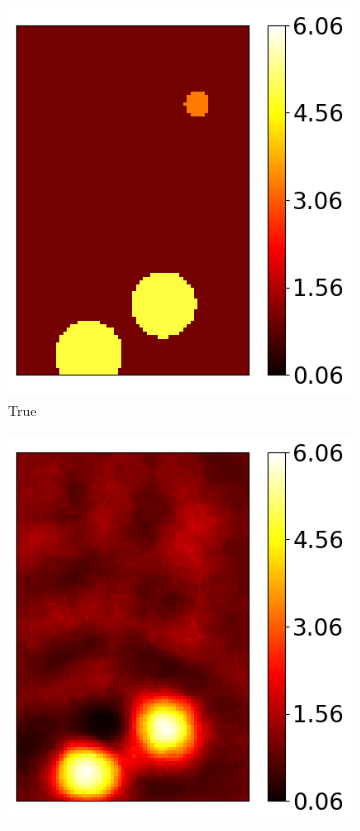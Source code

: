 \documentclass[12pt]{article}
\newcommand{\nhghaloesheight}{3.7cm}
\newcommand{\nhghaloeswidth}{0.19\linewidth}
\begin{document}
\begin{figure}[!h]
  \centering
  \begin{subfigure}[c]{\nhghaloeswidth}
  \centering    
    \includegraphics[totalheight=\nhghaloesheight]{Figures/softplus_halos_new/ex1_hot/mutrue.png}
    \caption{\label{fig:haloes_true} True}
  \end{subfigure}
  \begin{subfigure}[c]{\nhghaloeswidth}
  \centering    
    \includegraphics[totalheight=\nhghaloesheight]{Figures/softplus_halos_new/ex1_hot/musoftplus.png}

\end{subfigure}
\end{figure}
\end{document}
